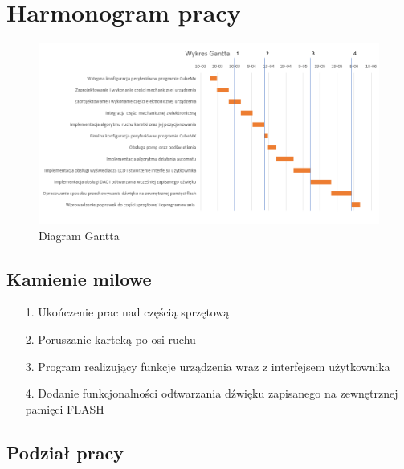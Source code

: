 \documentclass[10pt, a4paper]{article}
\begin{document}
\section{Harmonogram pracy}


\begin{figure}[H]
	\centering
	\includegraphics[width=1.4\textwidth,angle=270]{gant.PNG}
	\caption{Diagram Gantta}
	\label{fig:DiagramGantta}
\end{figure}

\subsection{Kamienie milowe}

\begin{itemize}

\item [1.] Ukończenie prac nad częścią sprzętową
\item [2.] Poruszanie karteką po osi ruchu
\item [3.] Program realizujący funkcje urządzenia wraz z interfejsem użytkownika
\item [4.]Dodanie funkcjonalności odtwarzania dźwięku zapisanego na zewnętrznej pamięci FLASH

\end{itemize}
\subsection{Podział pracy}

\textbf{}
\end{document}
